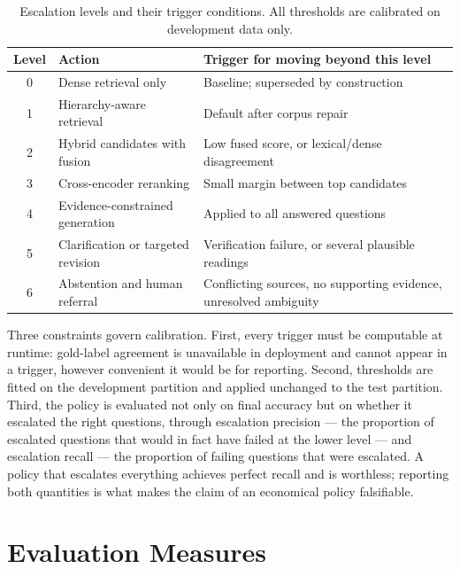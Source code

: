 \begin{table}[htbp]
  \centering
  \caption{Escalation levels and their trigger conditions. All thresholds are calibrated on development data only.}
  \label{tab:escalation-method}
  \small
  \begin{tabularx}{\textwidth}{@{}c l X@{}}
    \toprule
    \textbf{Level} & \textbf{Action} & \textbf{Trigger for moving beyond this level} \\
    \midrule
    0 & Dense retrieval only & Baseline; superseded by construction \\
    1 & Hierarchy-aware retrieval & Default after corpus repair \\
    2 & Hybrid candidates with fusion & Low fused score, or lexical/dense disagreement \\
    3 & Cross-encoder reranking & Small margin between top candidates \\
    4 & Evidence-constrained generation & Applied to all answered questions \\
    5 & Clarification or targeted revision & Verification failure, or several plausible readings \\
    6 & Abstention and human referral & Conflicting sources, no supporting evidence, unresolved ambiguity \\
    \bottomrule
  \end{tabularx}
\end{table}

Three constraints govern calibration. First, every trigger must be computable at runtime: gold-label agreement is unavailable in deployment and cannot appear in a trigger, however convenient it would be for reporting. Second, thresholds are fitted on the development partition and applied unchanged to the test partition. Third, the policy is evaluated not only on final accuracy but on whether it escalated the right questions, through escalation precision --- the proportion of escalated questions that would in fact have failed at the lower level --- and escalation recall --- the proportion of failing questions that were escalated. A policy that escalates everything achieves perfect recall and is worthless; reporting both quantities is what makes the claim of an economical policy falsifiable.

\section{Evaluation Measures}
\label{sec:method-measures}

